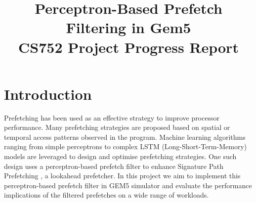 \documentclass[conference]{IEEEtran}
\begin{document}
\title{Perceptron-Based Prefetch Filtering in Gem5\\ CS752 Project Progress Report}


\author{
\and
{}
}

\maketitle

\section{Introduction}
Prefetching has been used as an effective strategy to improve processor performance. Many prefetching strategies are proposed based on spatial or temporal access patterns observed in the program. Machine learning algorithms ranging from simple perceptrons to complex LSTM (Long-Short-Term-Memory) models are leveraged to design and optimise prefetching strategies. One such design uses a perceptron-based prefetch filter\cite{ppf} to enhance Signature Path Prefetching \cite{SPP}, a lookahead prefetcher. In this project we aim to implement this perceptron-based prefetch filter\cite{ppf} in GEM5 \cite{lowepower2020gem5} simulator and evaluate the performance implications of the filtered prefetches on a wide range of workloads. 
\end{document}
